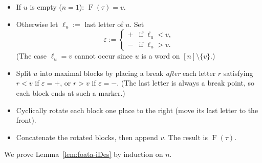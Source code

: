 \documentclass[11pt]{article}
\theoremstyle{definition}
\newcommand{\Foata}{\operatorname{F}}
\begin{document}
\begin{itemize}
\item If $u$ is empty ($n=1$): $\Foata(\tau) = v$.
\item Otherwise let $\ell_u :=$ last letter of $u$.  Set
    \[
        \varepsilon := \begin{cases} + & \text{if } \ell_u < v, \\
                                     - & \text{if } \ell_u > v. \end{cases}
    \]
    (The case $\ell_u = v$ cannot occur since $u$ is a word on
    $[n]\setminus\{v\}$.)
\item Split $u$ into maximal blocks by placing a break \emph{after} each
    letter $r$ satisfying $r < v$ if $\varepsilon = +$, or $r > v$ if
    $\varepsilon = -$.  (The last letter is always a break point, so each
    block ends at such a marker.)
\item Cyclically rotate each block one place to the right (move its last
    letter to the front).
\item Concatenate the rotated blocks, then append $v$.  The result is
    $\Foata(\tau)$.
\end{itemize}

We prove Lemma~\ref{lem:foata-iDes} by induction on $n$.
\end{document}
